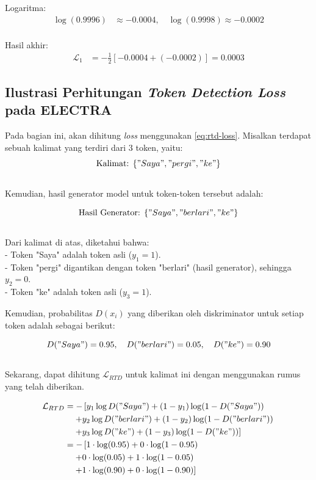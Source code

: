 Logaritma:\\
\begin{align*}
    \log(0.9996) &\approx -0.0004, \quad \log(0.9998) \approx -0.0002\\
\end{align*}

Hasil akhir:\\
\begin{align*}
    \mathcal{L}_1 &= - \frac{1}{2} \left[ -0.0004 + (-0.0002) \right] = 0.0003
\end{align*}

\subsection{Ilustrasi Perhitungan \textit{Token Detection Loss} pada ELECTRA} \label{subsec:ilustrasi_token_detection_loss_electra}

Pada bagian ini, akan dihitung \textit{loss} menggunakan \ref{eq:rtd-loss}. 
Misalkan terdapat sebuah kalimat yang terdiri dari 3 token, yaitu:\\
\[
\text{Kalimat: } \{ "Saya", "pergi", "ke" \}\\
\]
\\
Kemudian, hasil generator model untuk token-token tersebut adalah:

\[
\text{Hasil Generator: } \{ "Saya", "berlari", "ke" \}\\
\]
\\
Dari kalimat di atas, diketahui bahwa:\\
- Token "Saya" adalah token asli (\(y_1 = 1\)).\\
- Token "pergi" digantikan dengan token "berlari" (hasil generator), sehingga \(y_2 = 0\).\\
- Token "ke" adalah token asli (\(y_3 = 1\)).

Kemudian, probabilitas \(D(x_i)\) yang diberikan oleh diskriminator untuk setiap token adalah sebagai berikut:

\[
D("Saya") = 0.95, \quad D("berlari") = 0.05, \quad D("ke") = 0.90\\
\]
\\
Sekarang, dapat dihitung \(\mathcal{L}_{RTD}\) untuk kalimat ini dengan menggunakan rumus yang telah diberikan.

\begin{align*}
    \mathcal{L}_{RTD} &= - \left[ y_1 \log D("Saya") + (1 - y_1) \log (1 - D("Saya")) \right. \\
    &\quad \left. + y_2 \log D("berlari") + (1 - y_2) \log (1 - D("berlari")) \right. \\
    &\quad \left. + y_3 \log D("ke") + (1 - y_3) \log (1 - D("ke")) \right] \\
    &= - \left[ 1 \cdot \log(0.95) + 0 \cdot \log(1 - 0.95) \right. \\
    &\quad \left. + 0 \cdot \log(0.05) + 1 \cdot \log(1 - 0.05) \right. \\
    &\quad \left. + 1 \cdot \log(0.90) + 0 \cdot \log(1 - 0.90) \right]\\
\end{align*}

